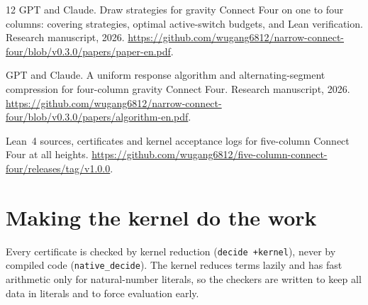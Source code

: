 \documentclass[11pt,a4paper]{article}
\theoremstyle{plain}
\theoremstyle{definition}
\newcommand{\code}[1]{{\upshape\texttt{\small\nolinkurl{#1}}}}
\begin{document}
\begin{thebibliography}{12}
GPT and Claude.
\newblock Draw strategies for gravity Connect Four on one to four columns: covering strategies, optimal active-switch budgets, and Lean verification.
\newblock Research manuscript, 2026.
\newblock \url{https://github.com/wugang6812/narrow-connect-four/blob/v0.3.0/papers/paper-en.pdf}.

GPT and Claude.
\newblock A uniform response algorithm and alternating-segment compression for four-column gravity Connect Four.
\newblock Research manuscript, 2026.
\newblock \url{https://github.com/wugang6812/narrow-connect-four/blob/v0.3.0/papers/algorithm-en.pdf}.

Lean~4 sources, certificates and kernel acceptance logs for five-column Connect Four at all heights.
\newblock \url{https://github.com/wugang6812/five-column-connect-four/releases/tag/v1.0.0}.

\end{thebibliography}

\appendix

\section{Making the kernel do the work}
\label{app:kernel}

Every certificate is checked by kernel reduction (\code{decide +kernel}), never by compiled code (\code{native_decide}). The kernel reduces terms lazily and has fast arithmetic only for natural-number literals, so the checkers are written to keep all data in literals and to force evaluation early.
\end{document}
